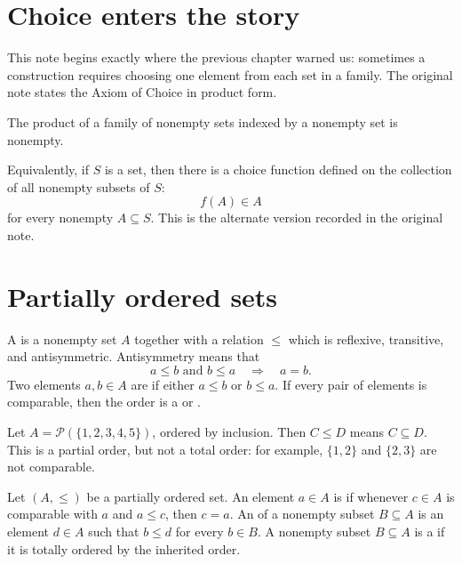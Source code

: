 
\section{Choice enters the story}

This note begins exactly where the previous chapter warned us: sometimes a construction requires choosing one element from each set in a family.  The original note states the Axiom of Choice in product form.

\begin{axiom}
The product of a family of nonempty sets indexed by a nonempty set is nonempty.
\end{axiom}

\begin{remark}
Equivalently, if \(S\) is a set, then there is a choice function defined on the collection of all nonempty subsets of \(S\):
\[
  f(A)\in A
\]
for every nonempty \(A\subseteq S\).  This is the alternate version recorded in the original note.
\end{remark}

\section{Partially ordered sets}

\begin{definition}
A  is a nonempty set \(A\) together with a relation \(\le\) which is reflexive, transitive, and antisymmetric.  Antisymmetry means that
\[
  a\le b\text{ and }b\le a\quad\Longrightarrow\quad a=b.
\]
Two elements \(a,b\in A\) are  if either \(a\le b\) or \(b\le a\).  If every pair of elements is comparable, then the order is a  or .
\end{definition}

\begin{example}
Let \(A=\mathcal P(\{1,2,3,4,5\})\), ordered by inclusion.  Then \(C\le D\) means \(C\subseteq D\).  This is a partial order, but not a total order: for example, \(\{1,2\}\) and \(\{2,3\}\) are not comparable.
\end{example}

Let \((A,\le)\) be a partially ordered set.  An element \(a\in A\) is  if whenever \(c\in A\) is comparable with \(a\) and \(a\le c\), then \(c=a\).  An  of a nonempty subset \(B\subseteq A\) is an element \(d\in A\) such that \(b\le d\) for every \(b\in B\).  A nonempty subset \(B\subseteq A\) is a  if it is totally ordered by the inherited order.

